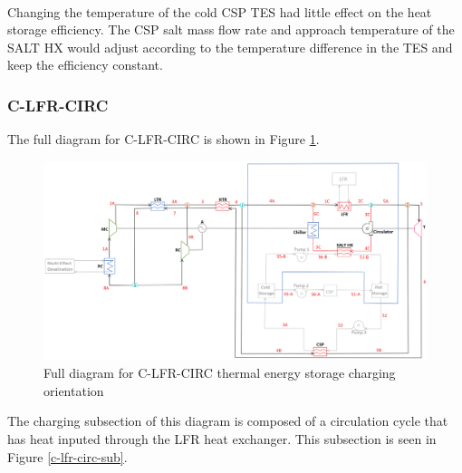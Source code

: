 \begin{paracol}{2}
\begin{specialtable}[H]
\begin{tabular}{lccc}
    \bottomrule
    \end{tabular}\\
\end{specialtable}

Changing the temperature of the cold CSP TES had little effect on the heat storage efficiency. The CSP salt mass flow rate and approach temperature of the SALT HX would adjust according to the temperature difference in the TES and keep the efficiency constant.

\subsubsection{C-LFR-CIRC} %

The full diagram for C-LFR-CIRC is shown in Figure \ref{c-lfr-circ}.

\end{paracol}
\begin{figure}[H]
    \widefigure
    \includegraphics[width=\linewidth]{Definitions/c-lfr-circ.pdf}
    \caption{Full diagram for C-LFR-CIRC thermal energy storage charging orientation\label{c-lfr-circ}}
\end{figure}
\begin{paracol}{2}
\linenumbers
\switchcolumn

The charging subsection of this diagram is composed of a circulation cycle that has heat inputed through the LFR heat exchanger. This subsection is seen in Figure \ref{c-lfr-circ-sub}.


\end{paracol}
